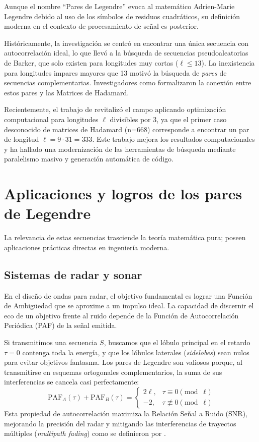 \documentclass[12pt,a4paper]{tfg_domingo}
\begin{document}
Aunque el nombre ``Pares de Legendre'' evoca al matemático Adrien-Marie Legendre debido
al uso de los símbolos de residuos cuadráticos, su definición moderna
en el contexto de procesamiento de señal es posterior. 

Históricamente, la investigación se centró en encontrar una única
secuencia con autocorrelación ideal, lo que llevó a la búsqueda de
secuencias pseudoaleatorias de Barker, que solo existen para longitudes muy cortas
($\ell \leq 13$). La inexistencia para longitudes impares mayores que 13 motivó la búsqueda
de \emph{pares} de secuencias complementarias. Investigadores como
\cite{seberry1992hadamard} formalizaron la conexión entre estos pares
y las Matrices de Hadamard. 

Recientemente, el trabajo de \cite{kotsireas2021legendre} revitalizó
el campo aplicando optimización computacional para longitudes $\ell$
divisibles por 3, ya que el primer caso desconocido de matrices de
Hadamard (n=668) corresponde a encontrar un par de longitud
$\ell=9\cdot31=333$. Este trabajo mejora los resultados computacionales y ha
hallado una modernización de las herramientas de búsqueda mediante
paralelismo masivo y generación  automática de código.


\section{Aplicaciones y logros de los pares de Legendre}

La relevancia de estas secuencias trasciende la teoría matemática pura; poseen aplicaciones prácticas directas en ingeniería moderna.

\subsection{Sistemas de radar y sonar}
En el diseño de ondas para radar, el objetivo fundamental es lograr una Función de Ambigüedad que se aproxime a un impulso ideal. La capacidad de discernir el eco de un objetivo frente al ruido depende de la Función de Autocorrelación Periódica (PAF) de la señal emitida.

Si transmitimos una secuencia $S$, buscamos que el lóbulo principal en el retardo $\tau = 0$ contenga toda la energía, y que los lóbulos laterales (\emph{sidelobes}) sean nulos para evitar objetivos fantasma. Los pares de Legendre son valiosos porque, al transmitirse en esquemas ortogonales complementarios, la suma de sus interferencias se cancela casi perfectamente:
\begin{equation} \label{Equation PAF}
     \text{PAF}_A(\tau) + \text{PAF}_B(\tau) = \begin{cases} 2\ell, & \tau \equiv 0 \pmod \ell \\ -2, & \tau \not\equiv 0 \pmod \ell \end{cases}
\end{equation} 
Esta propiedad de autocorrelación  maximiza la Relación Señal a Ruido
(SNR), mejorando la precisión  del radar y mitigando las interferencias de trayectos múltiples (\emph{multipath fading}) como se definieron por \cite{budivsin1991efficient}.
\end{document}
